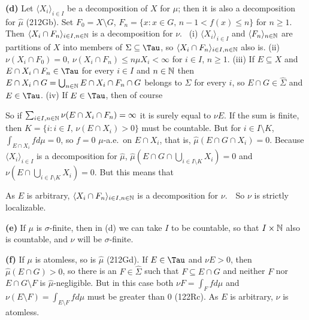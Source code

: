 {\medskip

{\bf (d)} Let
$\langle X_i\rangle_{i\in I}$ be a decomposition of $X$ for $\mu$;
then it is also a decomposition for $\hat\mu$ (212Gb).
Set $F_0=X\setminus G$, $F_n=\{x:x\in G,\,n-1<f(x)\le n\}$ for $n\ge 1$.
Then $\langle X_i\cap F_n\rangle_{i\in I,n\in\Bbb N}$ is a decomposition
for $\nu$.   \Prf\ (i) $\langle X_i\rangle_{i\in I}$ and
$\langle F_n\rangle_{n\in\Bbb N}$ are partitions of $X$ into members of $\Sigma\subseteq\Tau$, so
$\langle X_i\cap F_n\rangle_{i\in I,n\in\Bbb N}$ also is.
(ii)  $\nu(X_i\cap F_0)=0$,
$\nu(X_i\cap F_n)\le n\mu X_i<\infty$ for $i\in I$, $n\ge 1$.
(iii) If $E\subseteq X$ and $E\cap X_i\cap F_n\in\Tau$ for every
$i\in I$ and $n\in\Bbb N$ then
$E\cap X_i\cap G=\bigcup_{n\in\Bbb N}E\cap X_i\cap F_n\cap G$ belongs to
$\hat\Sigma$ for every $i$, so $E\cap G\in\hat\Sigma$ and
$E\in\Tau$.
(iv) If $E\in\Tau$, then of course


\noindent So if $\sum_{i\in I,n\in\Bbb N}\nu(E\cap X_i\cap F_n)=\infty$
it is surely equal to $\nu E$.   If the sum is finite, then
$K=\{i:i\in I,\,\nu(E\cap X_i)>0\}$ must be countable.   But for
$i\in I\setminus K$,
$\int_{E\cap X_i}fd\mu=0$, so $f=0\,\,\mu$-a.e.\ on $E\cap X_i$, that
is, $\hat\mu(E\cap G\cap X_i)=0$.   Because
$\langle X_i\rangle_{i\in I}$ is a decomposition for $\hat\mu$,
$\hat\mu(E\cap G\cap\bigcup_{i\in I\setminus K}X_i)=0$ and
$\nu(E\cap\bigcup_{i\in I\setminus K}X_i)=0$.   But this
means that


\noindent As $E$ is arbitrary,
$\langle X_i\cap F_n\rangle_{i\in I,n\in\Bbb N}$ is a decomposition for
$\nu$.\ \QeD\   So $\nu$ is strictly localizable.

\medskip

{\bf (e)} If $\mu$ is $\sigma$-finite, then in (d) we can take $I$ to be
countable, so that $I\times\Bbb N$ also is countable, and $\nu$ will be
$\sigma$-finite.

\medskip

{\bf (f)} If $\mu$ is atomless, so is $\hat\mu$ (212Gd).   If $E\in\Tau$
and $\nu E>0$, then $\hat\mu(E\cap G)>0$, so there is an $F\in\hat\Sigma$
such that $F\subseteq E\cap G$ and
neither $F$ nor $E\cap G\setminus F$ is $\hat\mu$-negligible.   But in this case both $\nu F=\int_Ffd\mu$ and
$\nu(E\setminus F)=\int_{E\setminus F}fd\mu$ must be greater than $0$
(122Rc).   As $E$ is arbitrary, $\nu$ is atomless.
}%

